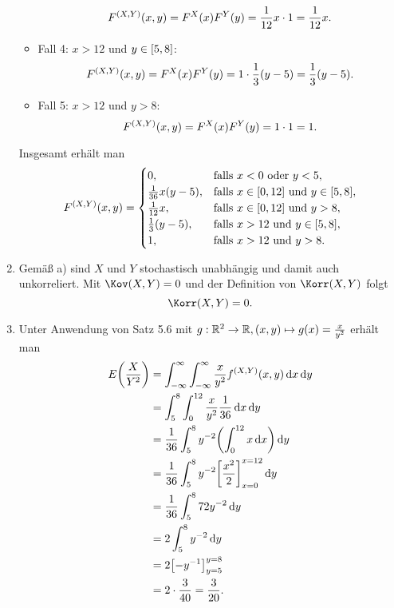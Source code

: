 \documentclass{exercise}
\begin{document}
\begin{enumerate}
\begin{itemize}
\[                F^{\parentheses*{X, Y}}\parentheses*{x, y} = F^X\parentheses*{x}F^Y\parentheses*{y} = \frac{1}{12}x \cdot 1 = \frac{1}{12}x.
            \]
            \item Fall 4: \(x > 12\) und \(y \in \brackets*{5, 8}\):
            \[
                F^{\parentheses*{X, Y}}\parentheses*{x, y} = F^X\parentheses*{x}F^Y\parentheses*{y} = 1 \cdot \frac{1}{3}\parentheses*{y - 5} = \frac{1}{3}\parentheses*{y - 5}.
            \]
            \item Fall 5: \(x > 12\) und \(y > 8\):
            \[
                F^{\parentheses*{X, Y}}\parentheses*{x, y} = F^X\parentheses*{x}F^Y\parentheses*{y} = 1 \cdot 1 = 1.
            \]
        \end{itemize}
        Insgesamt erhält man
        \[
            F^{\parentheses*{X, Y}}\parentheses*{x, y} = \begin{cases}
                0, & \text{falls }x < 0\text{ oder }y < 5,\\
                \frac{1}{36}x\parentheses*{y - 5}, & \text{falls }x \in \brackets*{0, 12}\text{ und }y \in \brackets*{5, 8},\\
                \frac{1}{12}x, & \text{falls }x \in \brackets*{0, 12}\text{ und }y > 8,\\
                \frac{1}{3}\parentheses*{y - 5}, & \text{falls }x > 12\text{ und }y \in \brackets*{5, 8},\\
                1, & \text{falls }x > 12\text{ und }y > 8.
            \end{cases}
        \]
        \item Gemäß a) sind \(X\) und \(Y\) stochastisch unabhängig und damit auch unkorreliert.
        Mit \(\Kov\parentheses*{X, Y} = 0\) und der Definition von \(\Korr\parentheses*{X, Y}\) folgt
        \[
            \Korr\parentheses*{X, Y} = 0.
        \]
        \item Unter Anwendung von Satz 5.6 mit \(g: \R^2 \to \R, \parentheses*{x, y} \mapsto g\parentheses*{x} = \frac{x}{y^2}\) erhält man
        \begin{align*}
            E\parentheses*{\frac{X}{Y^2}} &= \int_{-\infty}^\infty \int_{-\infty}^\infty \frac{x}{y^2}f^{\parentheses*{X, Y}}\parentheses*{x, y}\d x\d y\\
            &= \int_5^8 \int_0^{12}\frac{x}{y^2}\frac{1}{36}\d x\d y\\
            &= \frac{1}{36}\int_5^8 y^{-2}\parentheses*{\int_0^{12}x\d x}\d y\\
            &= \frac{1}{36}\int_5^8 y^{-2}\brackets*{\frac{x^2}{2}}_{x = 0}^{x = 12}\d y\\
            &= \frac{1}{36}\int_5^8 72y^{-2}\d y\\
            &= 2\int_5^8 y^{-2}\d y\\
            &= 2\brackets*{-y^{-1}}_{y = 5}^{y = 8}\\
            &= 2 \cdot \frac{3}{40} = \frac{3}{20}.
        \end{align*}
    \end{enumerate}
\end{document}
